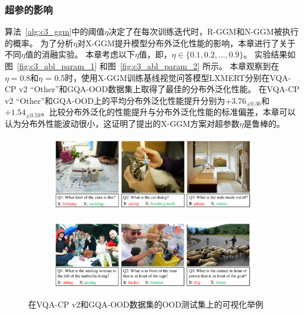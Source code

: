 \subsubsection{超参的影响}
算法~\ref{alg:c3_ggm}中的阈值$\eta$决定了在每次训练迭代时，R-GGM和N-GGM被执行的概率。
为了分析$\eta$对X-GGM提升模型分布外泛化性能的影响，本章进行了关于不同$\eta$值的消融实验。
本章考虑以下$\eta$值，即，$\eta \in \{0.1, 0.2, \dots, 0.9\}$。
实验结果如图~\ref{fig:c3_abl_param_1} 和图~\ref{fig:c3_abl_param_2} 所示。
本章观察到在$\eta = 0.8$和$\eta$ = 0.5时，使用X-GGM训练基线视觉问答模型LXMERT分别在VQA-CP v2 ``Other''和GQA-OOD数据集上取得了最佳的分布外泛化性能。
在VQA-CP v2 ``Other''和GQA-OOD上的平均分布外泛化性能提升分别为$+3.76_{\pm 0.36}$和$+1.54_{\pm 0.59}$。比较分布外泛化的性能提升与分布外泛化性能的标准偏差，本章可以认为分布外性能波动很小，这证明了提出的X-GGM方案对超参数$\eta$是鲁棒的。


\begin{figure}[!t]
\vspace{-3mm}
\begin{subfigure}[b]{1.0\textwidth}
\centering
\includegraphics[width=0.95\linewidth]{figure/c3_vis_cp.pdf}
\label{fig:c3_vis_cp}
\end{subfigure}
\begin{subfigure}[b]{1.0\textwidth}
\centering
\vspace{-1mm}
\includegraphics[width=0.95\linewidth]{figure/c3_vis_gqa.pdf}
\label{fig:c3_vis_gqa}
\end{subfigure}
\vspace{-6mm}
\caption{在VQA-CP v2和GQA-OOD数据集的OOD测试集上的可视化举例
}
\label{fig:c3_vis_prediction}
\end{figure}

